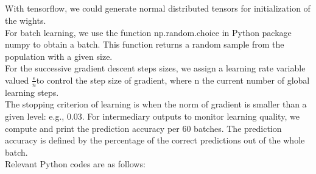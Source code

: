 \documentclass{article}
\begin{document}
\subsection{}With tensorflow, we could generate normal distributed tensors for initialization of the wights. \\
For batch learning, we use the function np.random.choice in Python package numpy to obtain a batch. This function returns a random sample from the population with a given size.\\
For the successive gradient descent steps sizes, we assign a learning rate variable valued $\frac{\epsilon}{n}$to control the step size of gradient, where n the current number of global learning steps.\\
The stopping criterion of learning is when the norm of gradient is smaller than a given level: e.g., 0.03.
For intermediary outputs to monitor learning quality, we compute and print the prediction accuracy per 60 batches. The prediction accuracy is defined by the percentage of the correct predictions out of the whole batch.\\
Relevant Python codes are as follows:
\end{document}
